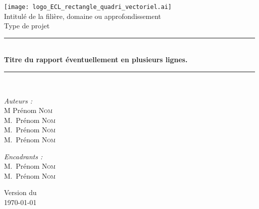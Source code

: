 \documentclass[a4paper,12pt,french]{article}
\begin{document}

\begin{titlepage}
  \begin{center}

    \texttt{[image: logo\_ECL\_rectangle\_quadri\_vectoriel.ai]}\\[1cm]

    {\large Intitulé de la filière, domaine ou approfondissement}\\[0.5cm]

    {\large Type de projet}\\[0.5cm]

    \rule{\linewidth}{0.5mm} \\[0.4cm]
    { \huge \bfseries Titre du rapport éventuellement en plusieurs lignes. \\[0.4cm] }
    \rule{\linewidth}{0.5mm} \\[1.5cm]

    \noindent
    \begin{minipage}{0.4\textwidth}
      \begin{flushleft} \large
        \emph{Auteurs :}\\
        M Prénom \textsc{Nom}\\
        M.~Prénom \textsc{Nom}\\
        M.~Prénom \textsc{Nom}\\
        M.~Prénom \textsc{Nom}
      \end{flushleft}
    \end{minipage}%
    \begin{minipage}{0.4\textwidth}
      \begin{flushright} \large
        \emph{Encadrants :} \\
        M.~Prénom \textsc{Nom}\\
        M.~Prénom \textsc{Nom}
      \end{flushright}
    \end{minipage}

    \vfill

    {\large Version du\\ \today}

  \end{center}
\end{titlepage}
\end{document}
